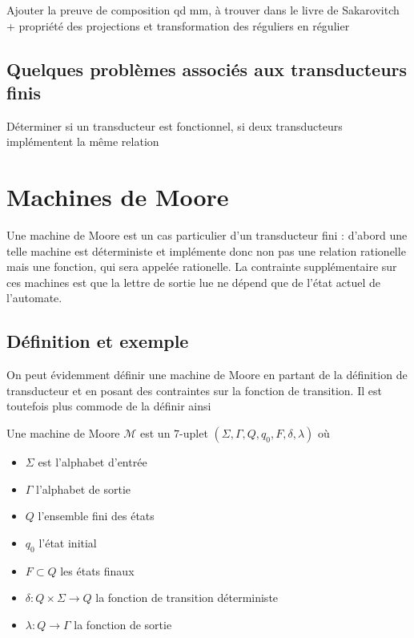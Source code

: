 \documentclass{scrartcl}
\begin{document}
\begin{flushleft}
Ajouter la preuve de composition qd mm, à trouver dans le livre de Sakarovitch + propriété des projections
et transformation des réguliers en régulier

\subsection{Quelques problèmes associés aux transducteurs finis}

Déterminer si un transducteur est fonctionnel, si deux transducteurs implémentent la même relation

\section{Machines de Moore}

Une machine de Moore est un cas particulier d'un transducteur fini : d'abord une telle machine est déterministe
et implémente donc non pas une relation rationelle mais une fonction, qui sera appelée rationelle. La contrainte
supplémentaire sur ces machines est que la lettre de sortie lue ne dépend que de l'état actuel de l'automate.

\subsection{Définition et exemple}

On peut évidemment définir une machine de Moore en partant de la définition de transducteur et en posant des
contraintes sur la fonction de transition. Il est toutefois plus commode de la définir ainsi

\begin{define}
    Une machine de Moore $\mathcal{M}$ est un $7$-uplet $(\Sigma, \Gamma, Q, q_0, F, \delta, \lambda)$ où
    \begin{itemize}
        \item $\Sigma$ est l'alphabet d'entrée
        \item $\Gamma$ l'alphabet de sortie
        \item $Q$ l'ensemble fini des états
        \item $q_0$ l'état initial
        \item $F \subset Q$ les états finaux
        \item $\delta : Q \times \Sigma \rightarrow Q$ la fonction de transition déterministe
        \item $\lambda : Q \rightarrow \Gamma$ la fonction de sortie
    \end{itemize}
\end{define}


\end{flushleft}
\end{document}
